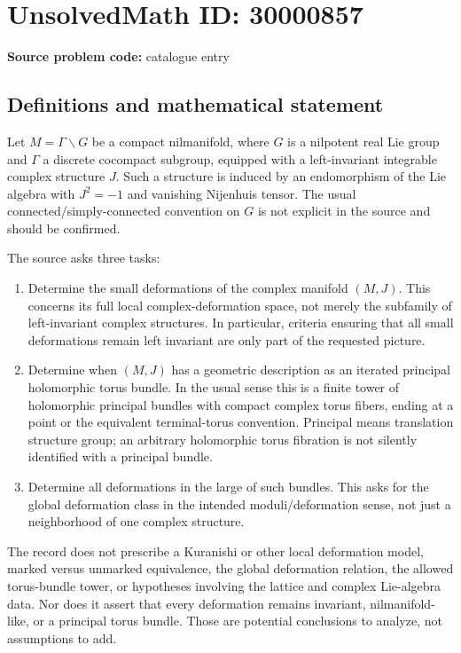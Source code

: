 \documentclass[11pt]{article}
\begin{document}
\section*{UnsolvedMath ID: 30000857}
\textbf{Source problem code:} catalogue entry
\subsection{Definitions and mathematical statement}
Let $M=\Gamma\backslash G$ be a compact nilmanifold, where $G$ is a nilpotent real Lie group and $\Gamma$ a discrete cocompact subgroup, equipped with a left-invariant integrable complex structure $J$. Such a structure is induced by an endomorphism of the Lie algebra with $J^2=-1$ and vanishing Nijenhuis tensor. The usual connected/simply-connected convention on $G$ is not explicit in the source and should be confirmed.

The source asks three tasks:
\begin{enumerate}
\item Determine the small deformations of the complex manifold $(M,J)$. This concerns its full local complex-deformation space, not merely the subfamily of left-invariant complex structures. In particular, criteria ensuring that all small deformations remain left invariant are only part of the requested picture.
\item Determine when $(M,J)$ has a geometric description as an iterated principal holomorphic torus bundle. In the usual sense this is a finite tower of holomorphic principal bundles with compact complex torus fibers, ending at a point or the equivalent terminal-torus convention. Principal means translation structure group; an arbitrary holomorphic torus fibration is not silently identified with a principal bundle.
\item Determine all deformations in the large of such bundles. This asks for the global deformation class in the intended moduli/deformation sense, not just a neighborhood of one complex structure.
\end{enumerate}

The record does not prescribe a Kuranishi or other local deformation model, marked versus unmarked equivalence, the global deformation relation, the allowed torus-bundle tower, or hypotheses involving the lattice and complex Lie-algebra data. Nor does it assert that every deformation remains invariant, nilmanifold-like, or a principal torus bundle. Those are potential conclusions to analyze, not assumptions to add.
\end{document}
